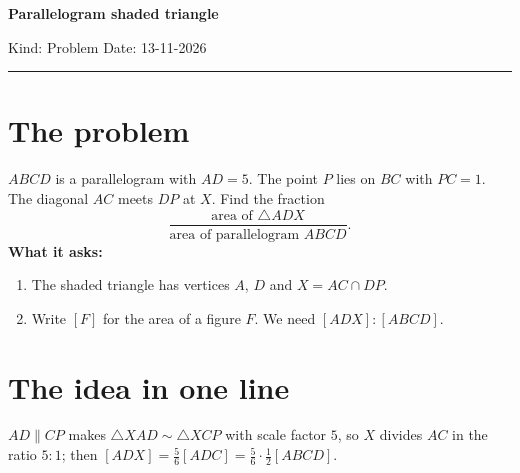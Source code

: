 \documentclass[11pt,a4paper]{article}
\begin{document}
{\LARGE\bfseries\color{accent} Parallelogram shaded triangle}\par
\vspace{2pt}
{\small Kind: Problem \quad Date: 13-11-2026}
\vspace{6pt}\hrule\vspace{6pt}

\section{The problem}
\begin{minipage}[c]{0.55\linewidth}
$ABCD$ is a parallelogram with $AD = 5$. The point $P$ lies on $BC$ with $PC = 1$.
The diagonal $AC$ meets $DP$ at $X$. Find the fraction
\[
\frac{\text{area of } \triangle ADX}{\text{area of parallelogram } ABCD}.
\]
\textbf{What it asks:}
\begin{enumerate}
  \item The shaded triangle has vertices $A$, $D$ and $X = AC \cap DP$.
  \item Write $[F]$ for the area of a figure $F$. We need $[ADX] : [ABCD]$.
\end{enumerate}
\end{minipage}\hfill
\begin{minipage}[c]{0.42\linewidth}
\centering
{}
\end{minipage}

\section{The idea in one line}
$AD \parallel CP$ makes $\triangle XAD \sim \triangle XCP$ with scale factor $5$, so $X$
divides $AC$ in the ratio $5:1$; then $[ADX] = \tfrac56[ADC] = \tfrac56\cdot\tfrac12[ABCD]$.
\end{document}
